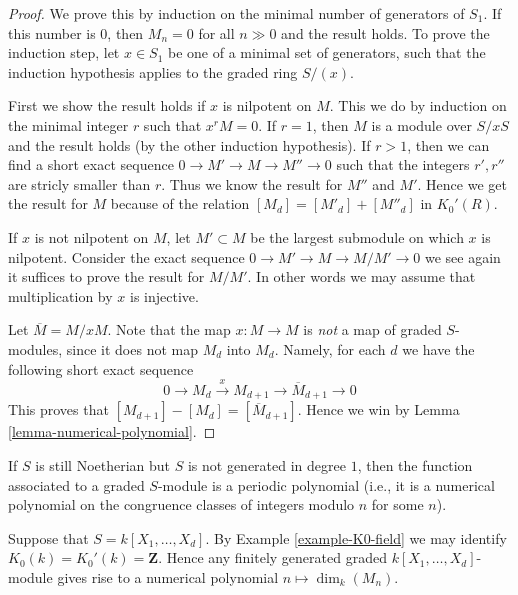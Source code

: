\begin{proof}
We prove this by induction on the minimal number of
generators of $S_1$. If this number is $0$, then
$M_n = 0$ for all $n \gg 0$ and the result holds.
To prove the induction step, let $x\in S_1$
be one of a minimal set of generators, such that
the induction hypothesis applies to the
graded ring $S/(x)$.

\medskip\noindent
First we show the result holds if $x$ is nilpotent on $M$.
This we do by induction on the minimal integer $r$ such that
$x^r M  = 0$. If $r = 1$, then $M$ is a module over $S/xS$
and the result holds (by the other induction hypothesis).
If $r > 1$, then we can find a short exact sequence
$0 \to M' \to M \to M'' \to 0$ such that the integers
$r', r''$ are stricly smaller than $r$. Thus we know
the result for $M''$ and $M'$. Hence
we get the result for $M$ because of the relation
$
[M_d]  = [M'_d] + [M''_d]
$
in $K_0'(R)$.

\medskip\noindent
If $x$ is not nilpotent on $M$, let $M' \subset M$ be
the largest submodule on which $x$ is nilpotent. 
Consider the exact sequence $0 \to M' \to M \to M/M' \to 0$
we see again it suffices to prove the result for $M/M'$. In other
words we may assume that multiplication by $x$ is injective.

\medskip\noindent
Let $\overline{M} = M/xM$. Note that the map $x : M \to M$
is {\it not} a map of graded $S$-modules, since it does
not map $M_d$ into $M_d$. Namely, for each $d$ we have the
following short exact sequence
$$
0 \to M_d \xrightarrow{x} M_{d+1} \to \overline{M}_{d+1} \to 0
$$
This proves that $[M_{d+1}] - [M_d] = [\overline{M}_{d+1}]$.
Hence we win by Lemma \ref{lemma-numerical-polynomial}.
\end{proof}

\begin{remark}
If $S$ is still Noetherian but $S$ is not generated in degree $1$,
then the function associated to a graded $S$-module is a periodic
polynomial (i.e., it is a numerical polynomial on the
congruence classes of integers modulo $n$ for some $n$).
\end{remark}

\begin{example}
\label{example-hilbert-function}
Suppose that $S = k[X_1,\ldots,X_d]$.
By Example \ref{example-K0-field} we may identify
$K_0(k) = K_0'(k) = \mathbf{Z}$. Hence any finitely
generated graded $k[X_1,\ldots,X_d]$-module
gives rise to a numerical polynomial
$n \mapsto \dim_k(M_n)$.
\end{example}

